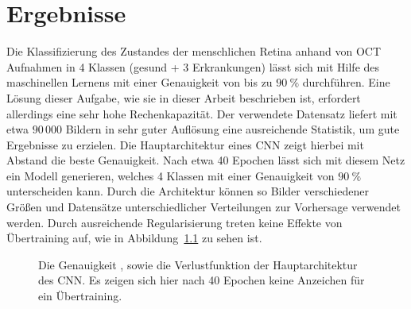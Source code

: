\chapter{Ergebnisse}
%
Die Klassifizierung des Zustandes der menschlichen Retina anhand von OCT
Aufnahmen in 4 Klassen (gesund + 3 Erkrankungen) lässt sich mit Hilfe des
maschinellen Lernens mit einer Genauigkeit von bis zu $\SI{90}{\percent}$
durchführen. Eine Lösung dieser Aufgabe, wie sie in dieser Arbeit beschrieben
ist, erfordert allerdings eine sehr hohe Rechenkapazität. Der verwendete
Datensatz liefert mit etwa $90\,000$ Bildern in sehr guter Auflösung eine
ausreichende Statistik, um gute Ergebnisse zu erzielen.
Die Hauptarchitektur eines CNN zeigt hierbei mit Abstand die beste
Genauigkeit. Nach etwa 40 Epochen lässt sich mit diesem Netz ein
Modell generieren, welches 4 Klassen mit einer Genauigkeit von
$\SI{90}{\percent}$ unterscheiden kann. Durch die Architektur können so Bilder
verschiedener Größen und Datensätze unterschiedlicher Verteilungen zur
Vorhersage verwendet werden. Durch ausreichende Regularisierung treten keine
Effekte von Übertraining auf, wie in Abbildung~\ref{fig:hist} zu sehen
ist.
%
\begin{figure}[h!]
  \caption{Die Genauigkeit \protect{}, sowie die Verlustfunktion \protect{} der Hauptarchitektur des CNN. Es zeigen sich hier nach 40 Epochen keine Anzeichen für ein Übertraining.}
  \label{fig:hist}
\end{figure}
